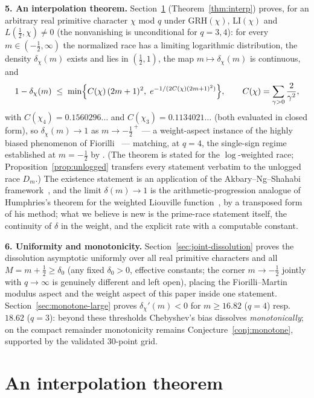 \documentclass[11pt]{article}
\begin{document}
\textbf{5. An interpolation theorem.} Section~\ref{sec:theorem}
(Theorem~\ref{thm:interp}) proves, for an arbitrary real primitive
character $\chi$ mod $q$ under GRH$(\chi)$, LI$(\chi)$ and
$L(\tfrac12,\chi)\ne0$ (the nonvanishing is unconditional for
$q=3,4$): for every $m\in(-\tfrac12,\infty)$ the
normalized race has a limiting logarithmic distribution, the density
$\delta_\chi(m)$ exists and lies in $(\tfrac12,1)$, the map
$m\mapsto\delta_\chi(m)$ is continuous, and
\[
1-\delta_\chi(m)\;\le\;\min\Bigl\{C(\chi)\,(2m+1)^2,\;
e^{-1/(2C(\chi)(2m+1)^2)}\Bigr\},\qquad
C(\chi)=\sum_{\gamma>0}\frac{2}{\gamma^2},
\]
with $C(\chi_4)=0.1560296\ldots$ and $C(\chi_3)=0.1134021\ldots$ (both
evaluated in closed form),
so $\delta_\chi(m)\to1$ as $m\to-\tfrac12^{\,+}$ --- a weight-aspect
instance of the highly biased phenomenon of Fiorilli~\cite{Fio14} ---
matching, at $q=4$, the single-sign
regime established at $m=-\tfrac12$ by \cite{AK23,Sheth24,Hay25}.
(The theorem is stated for the $\log$-weighted race;
Proposition~\ref{prop:unlogged} transfers every statement verbatim to
the unlogged race $D_m$.) The
existence statement is an application of the Akbary--Ng--Shahabi
framework~\cite{ANS14}, and the limit $\delta(m)\to1$ is the
arithmetic-progression analogue of Humphries's theorem for the weighted
Liouville function~\cite[Thm.~1.5]{Hum13}, by a transposed form of his
method; what we believe is new is the prime-race statement itself, the
continuity of $\delta$ in the weight, and the explicit rate with a
computable constant.

\textbf{6. Uniformity and monotonicity.}
Section~\ref{sec:joint-dissolution} proves the dissolution asymptotic
uniformly over all real primitive characters and all
$M=m+\tfrac12\ge\delta_0$ (any fixed $\delta_0>0$, effective
constants; the corner $m\to-\tfrac12$ jointly with $q\to\infty$ is
genuinely different and left open), placing the Fiorilli--Martin
modulus aspect and the weight aspect of this paper inside one
statement. Section~\ref{sec:monotone-large} proves
$\delta_\chi'(m)<0$ for $m\ge16.82$ ($q=4$) resp.\ $18.62$ ($q=3$):
beyond these thresholds Chebyshev's bias dissolves
\emph{monotonically}; on the compact remainder monotonicity remains
Conjecture~\ref{conj:monotone}, supported by the validated
$30$-point grid.

\section{An interpolation theorem}\label{sec:theorem}
\end{document}

